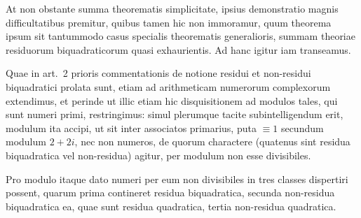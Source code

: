 At non obstante summa theorematis simplicitate, ipsius demonstratio magnis difficultatibus premitur, quibus tamen hic non immoramur, quum theorema ipsum sit tantummodo casus specialis theorematis generalioris, summam theoriae residuorum biquadraticorum quasi exhaurientis. Ad hanc igitur iam transeamus.

Quae in art.~2 prioris commentationis de notione residui et non-residui biquadratici prolata sunt, etiam ad arithmeticam numerorum complexorum extendimus, et perinde ut illic etiam hic disquisitionem ad modulos tales, qui sunt numeri primi, restringimus: simul plerumque tacite subintelligendum erit, modulum ita accipi, ut sit inter associatos primarius, puta $\equiv1$ secundum modulum $2+2i$, nec non numeros, de quorum charactere (quatenus sint residua biquadratica vel non-residua) agitur, per modulum non esse divisibiles.

Pro modulo itaque dato numeri per eum non divisibiles in tres classes dispertiri possent, quarum prima contineret residua biquadratica, secunda non-residua biquadratica ea, quae sunt residua quadratica, tertia non-residua quadratica.

